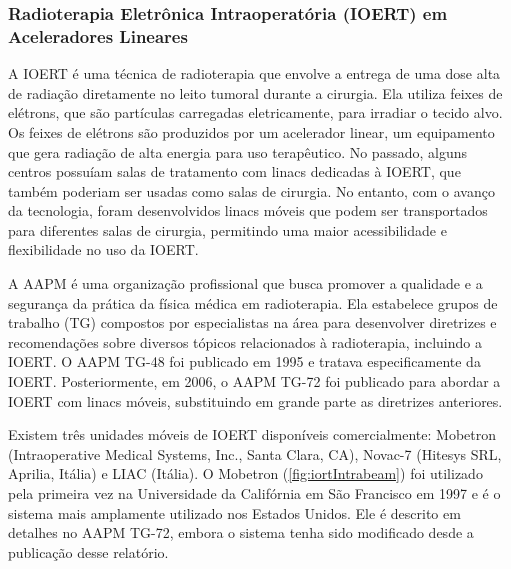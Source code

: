 \documentclass[11pt,a4paper]{article}
\begin{document}
\subsubsection*{Radioterapia Eletrônica Intraoperatória (IOERT) em Aceleradores Lineares}

	A IOERT é uma técnica de radioterapia que envolve a entrega de uma dose alta de radiação diretamente no leito tumoral durante a cirurgia. Ela utiliza feixes de elétrons, que são partículas carregadas eletricamente, para irradiar o tecido alvo. Os feixes de elétrons são produzidos por um acelerador linear, um equipamento que gera radiação de alta energia para uso terapêutico. No passado, alguns centros possuíam salas de tratamento com linacs dedicadas à IOERT, que também poderiam ser usadas como salas de cirurgia. No entanto, com o avanço da tecnologia, foram desenvolvidos linacs móveis que podem ser transportados para diferentes salas de cirurgia, permitindo uma maior acessibilidade e flexibilidade no uso da IOERT.

	A AAPM é uma organização profissional que busca promover a qualidade e a segurança da prática da física médica em radioterapia. Ela estabelece grupos de trabalho (TG) compostos por especialistas na área para desenvolver diretrizes e recomendações sobre diversos tópicos relacionados à radioterapia, incluindo a IOERT. O AAPM TG-48 foi publicado em 1995 e tratava especificamente da IOERT. Posteriormente, em 2006, o AAPM TG-72 foi publicado para abordar a IOERT com linacs móveis, substituindo em grande parte as diretrizes anteriores.

	Existem três unidades móveis de IOERT disponíveis comercialmente: Mobetron (Intraoperative Medical Systems, Inc., Santa Clara, CA), Novac-7 (Hitesys SRL, Aprilia, Itália) e LIAC (Itália). O Mobetron (\ref{fig:iortIntrabeam}) foi utilizado pela primeira vez na Universidade da Califórnia em São Francisco em 1997 e é o sistema mais amplamente utilizado nos Estados Unidos. Ele é descrito em detalhes no AAPM TG-72, embora o sistema tenha sido modificado desde a publicação desse relatório. 
\end{document}
